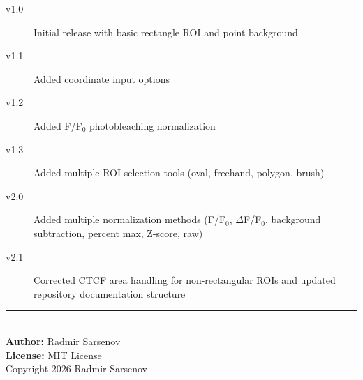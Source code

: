 \documentclass[11pt,a4paper]{article}
\begin{document}
\begin{description}
    \item[v1.0] Initial release with basic rectangle ROI and point background
    \item[v1.1] Added coordinate input options
    \item[v1.2] Added F/F$_0$ photobleaching normalization
    \item[v1.3] Added multiple ROI selection tools (oval, freehand, polygon, brush)
    \item[v2.0] Added multiple normalization methods (F/F$_0$, $\Delta$F/F$_0$, background subtraction, percent max, Z-score, raw)
    \item[v2.1] Corrected CTCF area handling for non-rectangular ROIs and updated repository documentation structure
\end{description}

\vfill

\begin{center}
\rule{0.5\textwidth}{0.4pt}\\[0.5cm]
\textbf{Author:} Radmir Sarsenov\\[0.3cm]
\textbf{License:} MIT License\\[0.3cm]
\small Copyright \textcopyright{} 2026 Radmir Sarsenov
\end{center}
\end{document}
